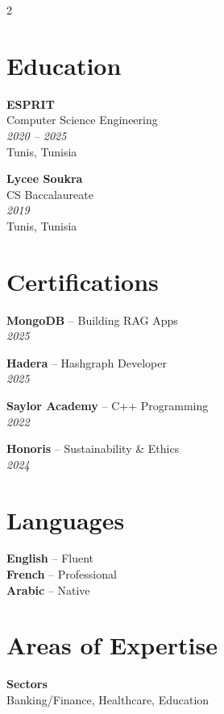 \documentclass[10pt,a4paper]{article}
\begin{document}
\vspace{5pt}
\begin{multicols}{2}

\section*{Education}
\vspace{2pt}
{\small
\textbf{ESPRIT}\\[1pt]
Computer Science Engineering\\[1pt]
\textit{2020 -- 2025}\\[1pt]
Tunis, Tunisia

\vspace{4pt}
\textbf{Lycee Soukra}\\[1pt]
CS Baccalaureate\\[1pt]
\textit{2019}\\[1pt]
Tunis, Tunisia
}

\vspace{4pt}
\section*{Certifications}
\vspace{2pt}
{\small
\textbf{MongoDB} -- Building RAG Apps\\[1pt]
\textit{2025}

\vspace{2pt}
\textbf{Hadera} -- Hashgraph Developer\\[1pt]
\textit{2025}

\vspace{2pt}
\textbf{Saylor Academy} -- C++ Programming\\[1pt]
\textit{2022}

\vspace{2pt}
\textbf{Honoris} -- Sustainability \& Ethics\\[1pt]
\textit{2024}
}

\columnbreak

\section*{Languages}
\vspace{2pt}
{\small
\textbf{English} -- Fluent\\[2pt]
\textbf{French} -- Professional\\[2pt]
\textbf{Arabic} -- Native
}

\vspace{4pt}
\section*{Areas of Expertise}
\vspace{2pt}
{\small
\textbf{Sectors}\\[1pt]
Banking/Finance, Healthcare, Education

}
\end{multicols}
\end{document}
